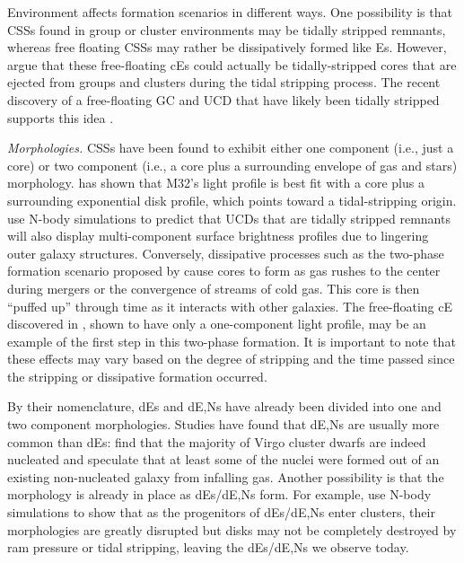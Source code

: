 \documentclass[iop,apj]{emulateapj}
\begin{document}
Environment affects formation scenarios in different ways. One possibility is that CSSs found in group or cluster environments may be tidally stripped remnants, whereas free floating CSSs may rather be dissipatively formed like Es. However, \citet{Chilingarian2015} argue that these free-floating cEs could actually be tidally-stripped cores that are ejected from groups and clusters during the tidal stripping process. The recent discovery of a free-floating GC and UCD that have likely been tidally stripped supports this idea \citep{Sandoval2015}.

\textit{Morphologies.} CSSs have been found to exhibit either one component (i.e., just a core) or two component (i.e., a core plus a surrounding envelope of gas and stars) morphology. \citet{Graham2002} has shown that M32's light profile is best fit with a core plus a surrounding exponential disk profile, which points toward a tidal-stripping origin. \citet{Pfeffer2013} use N-body simulations to predict that UCDs that are tidally stripped remnants will also display multi-component surface brightness profiles due to lingering outer galaxy structures. Conversely, dissipative processes such as the two-phase formation scenario proposed by \citet{Oser2010} cause cores to form as gas rushes to the center during mergers or the convergence of streams of cold gas. This core is then ``puffed up'' through time as it interacts with other galaxies. The free-floating cE discovered in \citet{Huxor2013}, shown to have only a one-component light profile, may be an example of the first step in this two-phase formation. It is important to note that these effects may vary based on the degree of stripping and the time passed since the stripping or dissipative formation occurred.

By their nomenclature, dEs and dE,Ns have already been divided into one and two component morphologies. Studies have found that dE,Ns are usually more common than dEs: \citet{Grant2005} find that the majority of Virgo cluster dwarfs are indeed nucleated and speculate that at least some of the nuclei were formed out of an existing non-nucleated galaxy from infalling gas. Another possibility is that the morphology is already in place as dEs/dE,Ns form. For example, \citet{Mastropietro2005a} use N-body simulations to show that as the progenitors of dEs/dE,Ns enter clusters, their morphologies are greatly disrupted but disks may not be completely destroyed by ram pressure or tidal stripping, leaving the dEs/dE,Ns we observe today.
\end{document}
